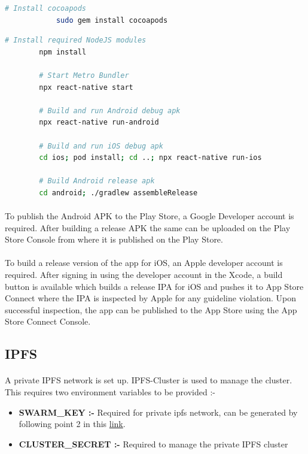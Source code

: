 \documentclass{article}
\begin{document}
            \begin{lstlisting}[language=bash, caption=Cocoapods installation, label=ios:cocoapods]
            # Install cocoapods
            sudo gem install cocoapods    
            \end{lstlisting}
        
        \begin{lstlisting}[language=bash, caption=Smartphone Application]
        # Install required NodeJS modules
        npm install
    
        # Start Metro Bundler
        npx react-native start
    
        # Build and run Android debug apk
        npx react-native run-android
        
        # Build and run iOS debug apk
        cd ios; pod install; cd ..; npx react-native run-ios
        
        # Build Android release apk
        cd android; ./gradlew assembleRelease
        \end{lstlisting}
        
        \paragraph{}
        To publish the Android APK to the Play Store, a Google Developer account is required. After building a release APK the same can be uploaded on the Play Store Console from where it is published on the Play Store.
        \paragraph{}
        To build a release version of the app for iOS, an Apple developer account is required. After signing in using the developer account in the Xcode, a build button is available which builds a release IPA for iOS and pushes it to App Store Connect where the IPA is inspected by Apple for any guideline violation. Upon successful inspection, the app can be published to the App Store using the App Store Connect Console.
    
    \subsection{IPFS}
        \paragraph{}
        A private IPFS network is set up. IPFS-Cluster is used to manage the cluster. This requires two environment variables to be provided :-
        \begin{itemize}
            \item \textbf{SWARM\_KEY :-} Required for private ipfs network, can be generated by following point 2 in this \href{https://github.com/ahester57/ipfs-private-swarm}{link}.
            \item \textbf{CLUSTER\_SECRET :-} Required to manage the private IPFS cluster
        \end{itemize}
    
\end{document}
